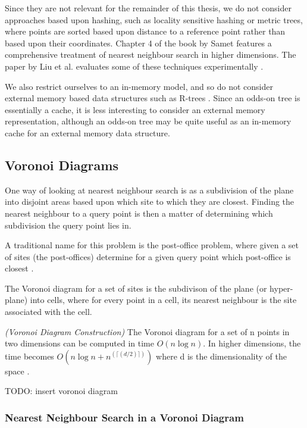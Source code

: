 \documentclass[mcs]{scsthesis}
\begin{document}
Since they are not relevant for the remainder of this thesis, we do not consider
approaches based upon hashing, such as locality sensitive hashing \cite{lsh}
or metric trees, where points are sorted based upon distance to a reference
point rather than based upon their coordinates. Chapter 4 of the book by Samet
\cite{samet} features a comprehensive treatment of nearest neighbour search in
higher dimensions. The paper by Liu et al. evaluates some of these techniques
experimentally \cite{practicalann}. 

We also restrict ourselves to an in-memory model, and so do not consider
external memory based data structures such as R-trees \cite{rtree}. Since an
odds-on tree is essentially a cache, it is less interesting to consider an
external memory representation, although an odds-on tree may be quite useful
as an in-memory cache for an external memory data structure. 

\subsection{Voronoi Diagrams}

One way of looking at nearest neighbour search is as a subdivision of the plane
into disjoint areas based upon which site to which they are closest. Finding
the nearest neighbour to a query point is then a matter of determining which
subdivision the query point lies in.

A traditional name for this problem is the post-office problem, where given a
set of sites (the post-offices) determine for a given query point which
post-office is closest \cite{dutch}.

The Voronoi diagram for a set of sites is the subdivison of the plane (or
hyper-plane) into cells, where for every point in a cell, its nearest neighbour
is the site associated with the cell.

\begin{thm} \emph{(Voronoi Diagram Construction)}
The Voronoi diagram for a set of n points in two dimensions can be computed
in time \(O(n \log n)\). In higher dimensions, the time becomes
\(O(n \log n + n^(\lceil(d/2)\rceil))\) where d is the dimensionality of the
space \cite{dutch}.
\end{thm}

TODO: insert voronoi diagram

\subsubsection{Nearest Neighbour Search in a Voronoi Diagram}
\end{document}
